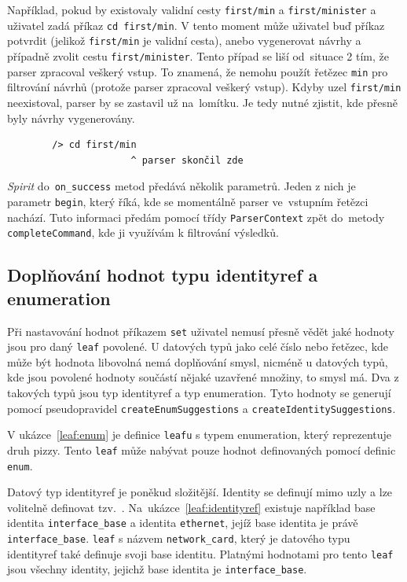 \documentclass[thesis=B,czech,hidelinks]{FITthesis}[2019/03/06]
\begin{document}
\begin{enumerate}
        Například, pokud by existovaly validní cesty \texttt{first/min} a \texttt{first/minister} a uživatel zadá příkaz \texttt{cd first/min}. V tento moment může uživatel buď příkaz potvrdit (jelikož \texttt{first/min} je validní cesta), anebo vygenerovat návrhy a případně zvolit cestu \texttt{first/minister}. Tento případ se liší od~situace 2 tím, že parser zpracoval veškerý vstup. To znamená, že nemohu použít řetězec \texttt{min} pro filtrování návrhů (protože parser zpracoval veškerý vstup). Kdyby uzel \texttt{first/min} neexistoval, parser by se zastavil už na~lomítku. Je tedy nutné zjistit, kde přesně byly návrhy vygenerovány.
        \begin{verbatim}
        /> cd first/min
                      ^ parser skončil zde
        \end{verbatim}

        \textit{Spirit} do~\texttt{on\_success} metod předává několik parametrů. Jeden z nich je parametr \texttt{begin}, který říká, kde se momentálně parser ve~vstupním řetězci nachází. Tuto informaci předám pomocí třídy \texttt{ParserContext} zpět do~metody \texttt{completeCommand}, kde ji využívám k filtrování výsledků.
\end{enumerate}

\subsection{Doplňování hodnot typu identityref a enumeration}
Při nastavování hodnot příkazem \texttt{set} uživatel nemusí přesně vědět jaké hodnoty jsou pro daný \texttt{leaf} povolené. U datových typů jako celé číslo nebo řetězec, kde může být hodnota libovolná nemá doplňování smysl, nicméně u datových typů, kde jsou povolené hodnoty součástí nějaké uzavřené množiny, to smysl má. Dva z takových typů jsou typ identityref a typ enumeration. Tyto hodnoty se generují pomocí pseudopravidel \texttt{createEnumSuggestions} a \texttt{createIdentitySuggestions}.

V ukázce~\ref{leaf:enum} je definice \texttt{leafu} s typem enumeration, který reprezentuje druh pizzy. Tento \texttt{leaf} může nabývat pouze hodnot definovaných pomocí definic \texttt{enum}.

Datový typ identityref je poněkud složitější. Identity se definují mimo uzly a lze volitelně definovat tzv.\ . Na~ukázce~\ref{leaf:identityref} existuje například base identita \texttt{interface\_base} a identita \texttt{ethernet}, jejíž base identita je právě \texttt{interface\_base}. \texttt{leaf} s názvem \texttt{network\_card}, který je datového typu identityref také definuje svoji base identitu. Platnými hodnotami pro tento \texttt{leaf} jsou všechny identity, jejichž base identita je \texttt{interface\_base}.
\end{document}
